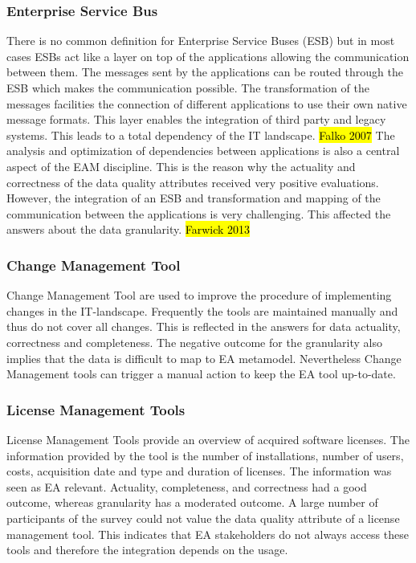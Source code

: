 \subsubsection{Enterprise Service Bus}
There is no common definition for Enterprise Service Buses (ESB) but in most cases ESBs act like a layer on top of the applications allowing the communication between them. The messages sent by the applications can be routed through the ESB which makes the communication possible. The transformation of the messages facilities the connection of different applications to use their own native message formats. This layer enables the integration of third party and legacy
systems. This leads to a total dependency of the IT landscape. \hl{Falko 2007}
The analysis and optimization of dependencies between applications is also a central aspect of the EAM discipline. This is the reason why the actuality and correctness of the data quality attributes received very positive evaluations. However, the integration of an ESB and transformation and mapping of the communication between the applications is very challenging. This affected the answers about the data granularity. \hl{Farwick 2013}

\subsubsection{Change Management Tool}
Change Management Tool are used to improve the procedure of implementing changes in the
IT-landscape. Frequently the tools are maintained manually and thus do not cover all changes. This is reflected in the answers for data actuality, correctness and completeness. The negative
outcome for the granularity also implies that the data is difficult to map to EA metamodel.
Nevertheless Change Management tools can trigger a manual action to keep the EA tool up-to-date.

\subsubsection{License Management Tools}
License Management Tools provide an overview of acquired software licenses. The information provided by the tool is the number of installations, number of users, costs, acquisition date and type and duration of licenses. The information was seen as EA relevant. Actuality, completeness, and correctness had a good outcome, whereas granularity has a moderated outcome. A large number of participants of the survey could not value the data quality attribute of a license management tool. This indicates that EA stakeholders do not always access these tools and therefore the integration depends on the usage.

